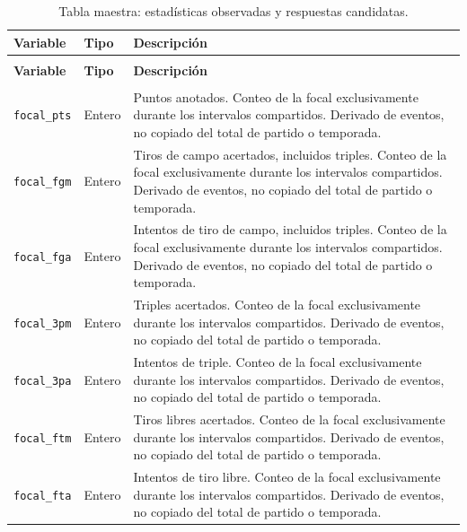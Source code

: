 \begingroup
\small
{}
\setlength{\tabcolsep}{4pt}
\renewcommand{\arraystretch}{1.15}
\begin{longtable}{@{}>{\raggedright\arraybackslash}p{5.0cm}>{\raggedright\arraybackslash}p{1.9cm}>{\raggedright\arraybackslash}p{7.7cm}@{}}
\caption{Tabla maestra: estadísticas observadas y respuestas candidatas.}\label{tab:maestra_observados}\\
\toprule\textbf{Variable}&\textbf{Tipo}&\textbf{Descripción}\\\midrule\endfirsthead
\multicolumn{3}{l}{\small Continuación de la Tabla~\ref{tab:maestra_observados}}\\
\toprule\textbf{Variable}&\textbf{Tipo}&\textbf{Descripción}\\\midrule\endhead
\midrule\multicolumn{3}{r}{\small Continúa en la siguiente página}\\\endfoot
\bottomrule\endlastfoot
\texttt{focal\_\allowbreak pts} & Entero & Puntos anotados. Conteo de la focal exclusivamente durante los intervalos compartidos. Derivado de eventos, no copiado del total de partido o temporada.\\
\texttt{focal\_\allowbreak fgm} & Entero & Tiros de campo acertados, incluidos triples. Conteo de la focal exclusivamente durante los intervalos compartidos. Derivado de eventos, no copiado del total de partido o temporada.\\
\texttt{focal\_\allowbreak fga} & Entero & Intentos de tiro de campo, incluidos triples. Conteo de la focal exclusivamente durante los intervalos compartidos. Derivado de eventos, no copiado del total de partido o temporada.\\
\texttt{focal\_\allowbreak 3pm} & Entero & Triples acertados. Conteo de la focal exclusivamente durante los intervalos compartidos. Derivado de eventos, no copiado del total de partido o temporada.\\
\texttt{focal\_\allowbreak 3pa} & Entero & Intentos de triple. Conteo de la focal exclusivamente durante los intervalos compartidos. Derivado de eventos, no copiado del total de partido o temporada.\\
\texttt{focal\_\allowbreak ftm} & Entero & Tiros libres acertados. Conteo de la focal exclusivamente durante los intervalos compartidos. Derivado de eventos, no copiado del total de partido o temporada.\\
\texttt{focal\_\allowbreak fta} & Entero & Intentos de tiro libre. Conteo de la focal exclusivamente durante los intervalos compartidos. Derivado de eventos, no copiado del total de partido o temporada.\\

\end{longtable}
